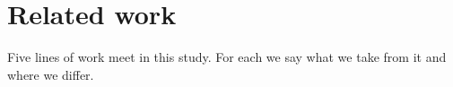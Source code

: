 %

\section{Related work}
\label{sec:related}

Five lines of work meet in this study. For each we say what we take from it and where we differ.

